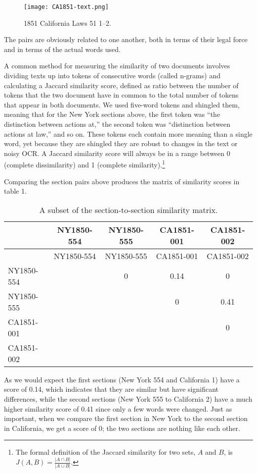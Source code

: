 \documentclass[12pt,]{article}
\let\rmarkdownfootnote\footnote%
\def\footnote{\protect\rmarkdownfootnote}
\begin{document}
\begin{figure}
\centering
\texttt{[image: CA1851-text.png]}
\caption{1851 California Laws 51 1--2.}
\end{figure}

The pairs are obviously related to one another, both in terms of their
legal force and in terms of the actual words used.

A common method for measuring the similarity of two documents involves
dividing texts up into tokens of consecutive words (called n-grams) and
calculating a Jaccard similarity score, defined as ratio between the
number of tokens that the two document have in common to the total
number of tokens that appear in both documents. We used five-word tokens
and shingled them, meaning that for the New York sections above, the
first token was ``the distinction between actions at,'' the second token
was ``distinction between actions at law,'' and so on. These tokens each
contain more meaning than a single word, yet because they are shingled
they are robust to changes in the text or noisy OCR. A Jaccard
similarity score will always be in a range between 0 (complete
dissimilarity) and 1 (complete similarity).\footnote{The formal
  definition of the Jaccard similarity for two sets, \(A\) and \(B\), is
  \(J(A, B) = \frac{ | A \cap B | }{ | A \cup B | }\).}

Comparing the section pairs above produces the matrix of similarity
scores in table 1.

\begin{longtable}[]{@{}lcccc@{}}
\caption{A subset of the section-to-section similarity
matrix.}\tabularnewline
\toprule
& NY1850-554 & NY1850-555 & CA1851-001 & CA1851-002\tabularnewline
\midrule
\endfirsthead
\toprule
& NY1850-554 & NY1850-555 & CA1851-001 & CA1851-002\tabularnewline
\midrule
\endhead
NY1850-554 & & 0 & 0.14 & 0\tabularnewline
NY1850-555 & & & 0 & 0.41\tabularnewline
CA1851-001 & & & & 0\tabularnewline
CA1851-002 & & & &\tabularnewline
\bottomrule
\end{longtable}

As we would expect the first sections (New York 554 and California 1)
have a score of 0.14, which indicates that they are similar but have
significant differences, while the second sections (New York 555 to
California 2) have a much higher similarity score of 0.41 since only a
few words were changed. Just as important, when we compare the first
section in New York to the second section in California, we get a score
of 0; the two sections are nothing like each other.
\end{document}
